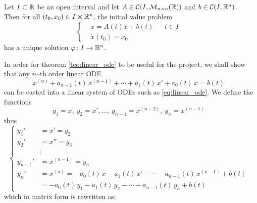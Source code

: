 \begin{theorem} \label{teo:linear_ode}
	Let $I \subset \mathbb{R}$ be an open interval and let $A \in \mathcal{C}(I,
	\mathcal{M}_{n \times n}(\mathbb{R}))$ and $b \in \mathcal{C}(I, \mathbb{R}^n)$. Then
	for all $(t_0, x_0) \in I \times \mathbb{R}^n$, the initial value problem
	\begin{equation*}
		\left\{
			\begin{aligned}
				&\dot{x} = A(t) x + b(t) & &t \in I \\
				&\dot{x}(t_0) = x_0
			\end{aligned}
		\right.
	\end{equation*}
	has a unique solution $\varphi \colon I \rightarrow \mathbb{R}^n$.
\end{theorem}

In order for theorem \ref{teo:linear_ode} to be useful for the project, we
shall show that any $n$--th order linear ODE
\begin{equation*}
	x^{(n)} + a_{n-1}(t) \, x^{(n-1)} + \cdots + a_1(t) \, x' + a_0(t) \, x = b(t) 
\end{equation*}
can be casted into a linear system of ODEs such as \eqref{eq:linear_ode}. We
define the functions
\begin{equation*}
	y_1 = x, \ y_2 = x', \ldots, \ y_{n-1} = x^{(n-2)}, \ y_n = x^{(n-1)}
\end{equation*}
thus
\begin{equation*}
	\left\{
		\begin{aligned}
			y_1' &= x' = y_2 \\
			y_2' &= x'' = y_3 \\
			&\vdots \\
			y_{n-1}' &= x^{(n-1)} = y_n \\
			y_n' &= x^{(n)} = -a_0(t) \, x - a_1(t) \, x' - \cdots - a_{n-1}(t) \, x^{(n-1)} + b(t) \\
			&= -a_0(t) \, y_1 - a_1(t) \, y_2 - \cdots - a_{n-1}(t) \, y_n + b(t)
		\end{aligned}
	\right.
\end{equation*}
which in matrix form is rewritten as:
